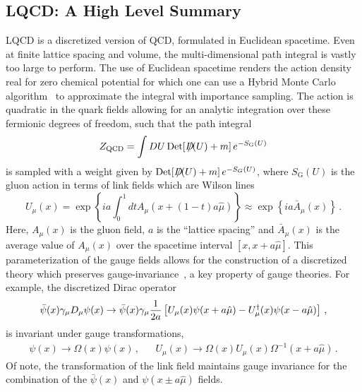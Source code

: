 \subsection{LQCD: A High Level Summary}
LQCD is a discretized version of QCD, formulated in Euclidean spacetime.
Even at finite lattice spacing and volume, the multi-dimensional path integral is vastly too large to perform.
The use of Euclidean spacetime renders the action density real for zero chemical potential for which one can use a Hybrid Monte Carlo algorithm~\cite{Duane:1987de} to approximate the integral with importance sampling.
The action is quadratic in the quark fields allowing for an analytic integration over these fermionic degrees of freedom, such that the path integral
\begin{equation}\label{eq:Z_QCD}
Z_{\mathrm{QCD}} = \int D U\, {\rm Det}[\Dslash(U) + m]\, e^{-S_{\mathrm{G}}(U)}
\end{equation}
is sampled with a weight given by ${\rm Det}[D\hskip-0.65em /(U) + m]\, e^{-S_G(U)}$, where $S_{\mathrm{G}}(U)$ is the gluon action in terms of link fields which are Wilson lines
\begin{equation}
U_\mu(x) = \exp\left\{i a\int_0^1 dt A_\mu(x +(1-t)a\hat{\mu}) \right\}
    \approx \exp\left\{i a \bar{A}_\mu(x) \right\}\, .
\end{equation}
Here, $A_\mu(x)$ is the gluon field, $a$ is the ``lattice spacing'' and $\bar{A}_\mu(x)$ is the average value of $A_\mu(x)$ over the spacetime interval $[x, x+a\hat{\mu}]$.
This parameterization of the gauge fields allows for the construction of a discretized theory which preserves gauge-invariance~\cite{Wilson:1974sk}, a key property of gauge theories.
For example, the discretized Dirac operator
\begin{equation}\label{eq:naive_fermions}
\bar{\psi}(x)\g_\mu D_\mu \psi(x) \rightarrow
\bar{\psi}(x)\g_\mu\frac{1}{2a}\left[U_\mu(x)\psi(x+a\hat{\mu}) -U^\dagger_\mu(x)\psi(x-a\hat{\mu}) \right]\, ,
\end{equation}
is invariant under gauge transformations,
\begin{align}
&\psi(x)\rightarrow \Omega(x)\psi(x)\, ,&
&U_\mu(x)\rightarrow \Omega(x)U_\mu(x)\Omega^{-1}(x+a\hat{\mu})\, .&
\end{align}
Of note, the transformation of the link field maintains gauge invariance for the combination of the $\bar{\psi}(x)$ and $\psi(x\pm a\hat{\mu})$ fields.


